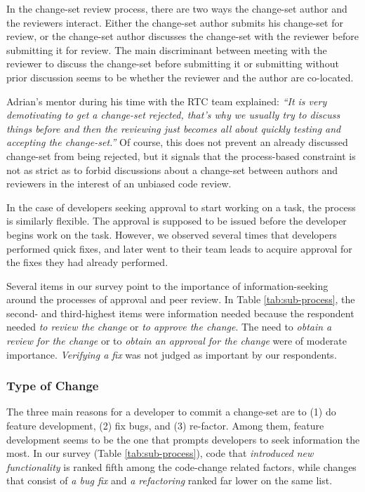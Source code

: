 In the change-set review process, there are two ways the change-set author and the reviewers interact.
Either the change-set author submits his change-set for review, or the change-set author discusses the change-set with the reviewer before submitting it for review. The main discriminant between meeting with the reviewer to discuss the change-set before submitting it or submitting without prior discussion seems to be whether the reviewer and the author are co-located.

Adrian's mentor during his time with the RTC team explained: \emph{``It is very demotivating to get a change-set rejected, that's why we usually try to discuss things before and then the reviewing just becomes all about quickly testing and accepting the change-set.''} Of course, this does not prevent an already discussed change-set from being rejected, but it signals that the process-based constraint is not as strict as to forbid discussions about a change-set between authors and reviewers in the interest of an unbiased code review.

In the case of developers seeking approval to start working on a task, the process is similarly flexible. The approval is supposed to be issued before the developer begins work on the task. However, we observed several times that developers performed quick fixes, and later went to their team leads to acquire approval for the fixes they had already performed.

Several items in our survey point to the importance of information-seeking around the processes of approval and peer review. In Table \ref{tab:sub-process}, the second- and third-highest items were information needed because the respondent needed \emph{to review the change} or \emph{to approve the change}. The need to  \emph{obtain a review for the change} or to \emph{obtain an approval for the change} were of moderate importance. \emph{Verifying a fix} was not judged as important by our respondents.

\subsubsection{Type of Change}
The three main reasons for a developer to commit a change-set are to (1) do feature development, (2) fix bugs, and (3) re-factor. Among them, feature development seems to be the one that prompts developers to seek information the most.
In our survey (Table \ref{tab:sub-process}), code that \emph{introduced new functionality} is ranked fifth among the code-change related factors, while changes that consist of \emph{a bug fix} and \emph{a refactoring} ranked far lower on the same list.

